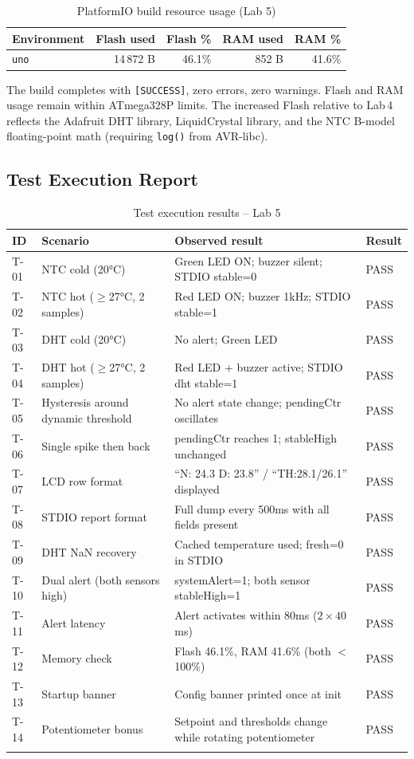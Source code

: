 \documentclass[12pt]{article}
\begin{document}
\begin{table}[H]
\centering
\begin{tabular}{lrrrr}
\toprule
\textbf{Environment} & \textbf{Flash used} & \textbf{Flash \%} & \textbf{RAM used} & \textbf{RAM \%} \\
\midrule
\texttt{uno} & 14\,872 B & 46.1\% & 852 B & 41.6\% \\
\bottomrule
\end{tabular}
\caption{PlatformIO build resource usage (Lab 5)}
\label{tab:build}
\end{table}

The build completes with \texttt{[SUCCESS]}, zero errors, zero warnings. Flash and RAM usage remain within ATmega328P limits. The increased Flash relative to Lab\,4 reflects the Adafruit DHT library, LiquidCrystal library, and the NTC B-model floating-point math (requiring \texttt{log()} from AVR-libc).

\subsection{Test Execution Report}

\begin{longtable}{p{0.8cm} p{3.5cm} p{6.5cm} p{1.5cm}}
\toprule
\textbf{ID} & \textbf{Scenario} & \textbf{Observed result} & \textbf{Result} \\
\midrule
\endhead
T-01 & NTC cold (20°C) & Green LED ON; buzzer silent; STDIO stable=0 & PASS \\
T-02 & NTC hot ($\geq$27°C, 2 samples) & Red LED ON; buzzer 1kHz; STDIO stable=1 & PASS \\
T-03 & DHT cold (20°C) & No alert; Green LED & PASS \\
T-04 & DHT hot ($\geq$27°C, 2 samples) & Red LED + buzzer active; STDIO dht stable=1 & PASS \\
T-05 & Hysteresis around dynamic threshold & No alert state change; pendingCtr oscillates & PASS \\
T-06 & Single spike then back & pendingCtr reaches 1; stableHigh unchanged & PASS \\
T-07 & LCD row format & ``N: 24.3 D: 23.8'' / ``TH:28.1/26.1'' displayed & PASS \\
T-08 & STDIO report format & Full dump every 500ms with all fields present & PASS \\
T-09 & DHT NaN recovery & Cached temperature used; fresh=0 in STDIO & PASS \\
T-10 & Dual alert (both sensors high) & systemAlert=1; both sensor stableHigh=1 & PASS \\
T-11 & Alert latency & Alert activates within 80ms ($2\times40$ms) & PASS \\
T-12 & Memory check & Flash 46.1\%, RAM 41.6\% (both $<$ 100\%) & PASS \\
T-13 & Startup banner & Config banner printed once at init & PASS \\
T-14 & Potentiometer bonus & Setpoint and thresholds change while rotating potentiometer & PASS \\
\bottomrule
\caption{Test execution results -- Lab 5}
\label{tab:testresults}
\end{longtable}
\end{document}
